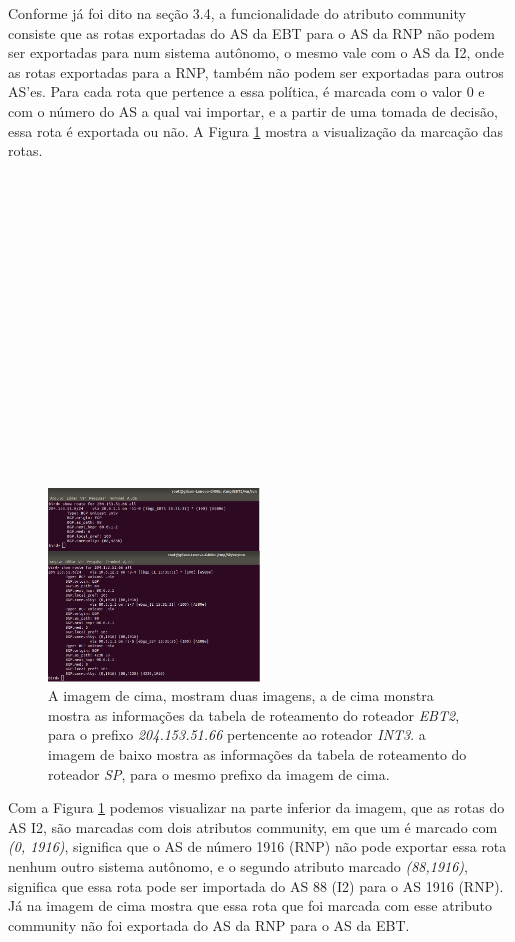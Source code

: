 \documentclass[12pt,a4paper]{report}
\begin{document}
Conforme j\'a foi dito na se\c{c}\~ao 3.4, a funcionalidade do atributo community consiste que as rotas exportadas do AS da EBT para o AS da RNP n\~ao podem ser exportadas para num sistema aut\^onomo, o mesmo vale com o AS da I2, onde as rotas exportadas para a RNP, tamb\'em n\~ao podem ser exportadas para outros AS'es. Para cada rota que pertence a essa pol\'itica, \'e marcada com o valor 0 e com o n\'umero do AS a qual vai importar, e a partir de uma tomada de decis\~ao, essa rota \'e exportada ou n\~ao. A Figura \ref{fig:imagem11} mostra a visualiza\c{c}\~ao da marca\c{c}\~ao das rotas.
\\
\\
\\
\\
\\
\\
\\
\\
\\
\\
\\
\\
\\
\\
\\
\\
\\
\begin{figure}[!htb]
 \centering
 \includegraphics[width=0.5\textwidth]{Imagens/COMMUNITY}
  \caption{\label{fig:imagem11} A imagem de cima, mostram duas imagens, a de cima monstra mostra as informa\c{c}\~oes da tabela de roteamento do roteador \textit{EBT2}, para o prefixo \textit{204.153.51.66} pertencente ao roteador \textit{INT3}. a imagem de baixo mostra as informa\c{c}\~oes da tabela de roteamento do roteador \textit{SP}, para o mesmo prefixo da imagem de cima.}
\end{figure}

Com a Figura \ref{fig:imagem11} podemos visualizar na parte inferior da imagem, que as rotas do AS I2, s\~ao marcadas com dois atributos community, em que um \'e marcado com \textit{(0, 1916)}, significa que o AS de n\'umero 1916 (RNP) n\~ao pode exportar essa rota nenhum outro sistema aut\^onomo, e o segundo atributo marcado \textit{(88,1916)}, significa que essa rota pode ser importada do AS 88 (I2) para o AS 1916 (RNP). J\'a na imagem de cima mostra que essa rota que foi marcada com esse atributo community n\~ao foi exportada do AS da RNP para o AS da EBT.
\end{document}
